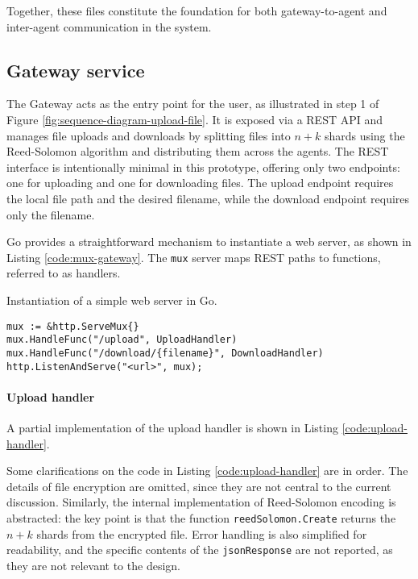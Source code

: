 Together, these files constitute the foundation for both gateway-to-agent and inter-agent communication in the system.

\subsection{Gateway service} 

The Gateway acts as the entry point for the user, as illustrated in step 1 of Figure \ref{fig:sequence-diagram-upload-file}. It is exposed via a REST API and manages file uploads and downloads by splitting files into $n+k$ shards using the Reed-Solomon algorithm and distributing them across the agents. The REST interface is intentionally minimal in this prototype, offering only two endpoints: one for uploading and one for downloading files. The upload endpoint requires the local file path and the desired filename, while the download endpoint requires only the filename.

Go provides a straightforward mechanism to instantiate a web server, as shown in Listing \ref{code:mux-gateway}. The \texttt{mux} server maps REST paths to functions, referred to as handlers. 

\begin{listing}\caption{Instantiation of a simple web server in Go.}

\label{code:mux-gateway}
\begin{verbatim}
mux := &http.ServeMux{}
mux.HandleFunc("/upload", UploadHandler)
mux.HandleFunc("/download/{filename}", DownloadHandler)
http.ListenAndServe("<url>", mux);
\end{verbatim}
\end{listing}


\paragraph{Upload handler}

A partial implementation of the upload handler is shown in Listing \ref{code:upload-handler}.

Some clarifications on the code in Listing \ref{code:upload-handler} are in order.
The details of file encryption are omitted, since they are not central to the current discussion. Similarly, the internal implementation of Reed-Solomon encoding is abstracted: the key point is that the function \texttt{reedSolomon.Create} returns the $n+k$ shards from the encrypted file. Error handling is also simplified for readability, and the specific contents of the \texttt{jsonResponse} are not reported, as they are not relevant to the design.

